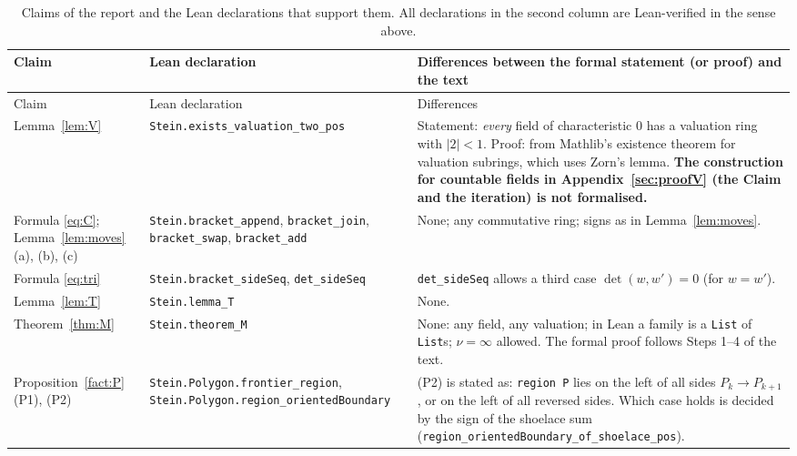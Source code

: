 \documentclass[11pt]{article}
\theoremstyle{definition}
\newcommand{\tL}[1]{\texttt{#1}}
\begin{document}
{\small
\begin{longtable}{@{}>{\raggedright\arraybackslash}p{3.5cm}>{\raggedright\arraybackslash}p{4.6cm}>{\raggedright\arraybackslash}p{6.6cm}@{}}
\caption{Claims of the report and the Lean declarations that support them. All declarations in the
second column are Lean-verified in the sense above.}\label{tab:lean}\\
\toprule
Claim & Lean declaration & Differences between the formal statement (or proof) and the text\\
\midrule
\endfirsthead
\toprule
Claim & Lean declaration & Differences\\
\midrule
\endhead
\bottomrule
\endfoot
Lemma~\ref{lem:V} & \tL{Stein.exists\_valuation\_\allowbreak two\_pos} & Statement: \emph{every} field of characteristic $0$ has a valuation ring with $|2|<1$. Proof: from Mathlib's existence theorem for valuation subrings, which uses Zorn's lemma. \textbf{The construction for countable fields in Appendix~\ref{sec:proofV} (the Claim and the iteration) is not formalised.}\\
Formula \eqref{eq:C}; Lemma~\ref{lem:moves} (a), (b), (c) & \tL{Stein.bracket\_append}, \tL{bracket\_join}, \tL{bracket\_swap}, \tL{bracket\_add} & None; any commutative ring; signs as in Lemma~\ref{lem:moves}.\\
Formula \eqref{eq:tri} & \tL{Stein.bracket\_sideSeq}, \tL{det\_sideSeq} & \tL{det\_sideSeq} allows a third case $\det(w,w')=0$ (for $w=w'$).\\
Lemma~\ref{lem:T} & \tL{Stein.lemma\_T} & None.\\
Theorem~\ref{thm:M} & \tL{Stein.theorem\_M} & None: any field, any valuation; in Lean a family is a \tL{List} of \tL{List}s; $\nu=\infty$ allowed. The formal proof follows Steps 1--4 of the text.\\
Proposition~\ref{fact:P} (P1), (P2) & \tL{Stein.Polygon.\allowbreak frontier\_region}, \tL{Stein.Polygon.\allowbreak region\_orientedBoundary} & (P2) is stated as: \tL{region P} lies on the left of all sides $P_k\to P_{k+1}$, or on the left of all reversed sides. Which case holds is decided by the sign of the shoelace sum (\tL{region\_orientedBoundary\_\allowbreak of\_shoelace\_pos}).\\

\end{longtable}}
\end{document}
